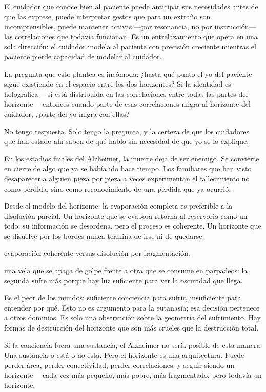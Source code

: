 El cuidador que conoce bien al paciente puede anticipar sus necesidades antes de que las exprese, puede interpretar gestos que para un extraño son incomprensibles, puede mantener activas —por resonancia, no por instrucción— las correlaciones que todavía funcionan. Es un entrelazamiento que opera en una sola dirección: el cuidador modela al paciente con precisión creciente mientras el paciente pierde capacidad de modelar al cuidador.

La pregunta que esto plantea es incómoda: ¿hasta qué punto el yo del paciente sigue existiendo en el espacio entre los dos horizontes? Si la identidad es holográfica —si está distribuida en las correlaciones entre todas las partes del horizonte— entonces cuando parte de esas correlaciones migra al horizonte del cuidador, ¿parte del yo migra con ellas?

No tengo respuesta. Solo tengo la pregunta, y la certeza de que los cuidadores que han estado ahí saben de qué hablo sin necesidad de que yo se lo explique.

\noindent En los estadios finales del Alzheimer, la muerte deja de ser enemigo. Se convierte en cierre de algo que ya se había ido hace tiempo. Los familiares que han visto desaparecer a alguien pieza por pieza a veces experimentan el fallecimiento no como pérdida, sino como reconocimiento de una pérdida que ya ocurrió.

Desde el modelo del horizonte: la evaporación completa es preferible a la disolución parcial. Un horizonte que se evapora retorna al reservorio como un todo; su información se desordena, pero el proceso es coherente. Un horizonte que se disuelve por los bordes nunca termina de irse ni de quedarse.

\begin{fisica}
 evaporación coherente versus disolución por fragmentación.

 una vela que se apaga de golpe frente a otra que se consume en parpadeos: la segunda sufre más porque hay luz suficiente para ver la oscuridad que llega.
\end{fisica}
Es el peor de los mundos: suficiente conciencia para sufrir, insuficiente para entender por qué. Esto no es argumento para la eutanasia; esa decisión pertenece a otros dominios. Es solo una observación sobre la geometría del sufrimiento. Hay formas de destrucción del horizonte que son más crueles que la destrucción total.

\noindent Si la conciencia fuera una sustancia, el Alzheimer no sería posible de esta manera. Una sustancia o está o no está. Pero el horizonte es una arquitectura. Puede perder área, perder conectividad, perder correlaciones, y seguir siendo un horizonte —cada vez más pequeño, más pobre, más fragmentado, pero todavía un horizonte.

